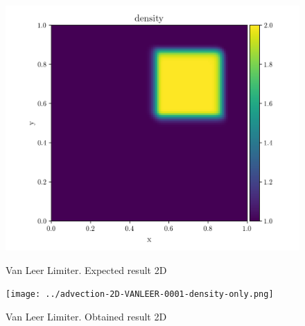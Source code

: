 \begin{figure}[htbp]
    \centering
	\includegraphics[width=.7\textwidth]{./figures/advection-2D-VANLEER-0001-density-only.png}%
	\caption{Van Leer Limiter. Expected result 2D}
	\texttt{[image: ../advection-2D-VANLEER-0001-density-only.png]}%
	\caption{Van Leer Limiter. Obtained result 2D}
\end{figure}












